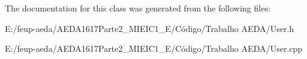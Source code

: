The documentation for this class was generated from the following files\+:\begin{DoxyCompactItemize}
\item 
E\+:/feup-\/aeda/\+A\+E\+D\+A1617\+Parte2\+\_\+M\+I\+E\+I\+C1\+\_\+\+E/\+Código/\+Trabalho A\+E\+D\+A/User.\+h\item 
E\+:/feup-\/aeda/\+A\+E\+D\+A1617\+Parte2\+\_\+M\+I\+E\+I\+C1\+\_\+\+E/\+Código/\+Trabalho A\+E\+D\+A/User.\+cpp\end{DoxyCompactItemize}
